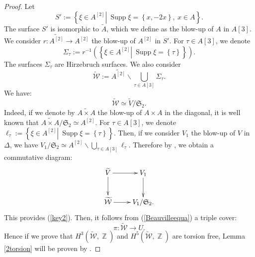 \documentclass[a4paper]{article}
\theoremstyle{remark}
\DeclareMathOperator{\Z}{\mathbb{Z}}
\DeclareMathOperator{\Supp}{Supp}
\begin{document}
\begin{proof}
Let $$S':=\left\{\left.\xi\in A^{[2]}\right|\ \Supp \xi=\left\{x,-2x\right\},\ x\in A\right\}.$$
The surface $S'$ is isomorphic to $\widetilde{A}$, which we define as the blow-up of $A$ in $A[3]$.
We consider $r:\widetilde{A^{[2]}}\rightarrow A^{[2]}$ the blow-up of $A^{[2]}$ in $S'$.
For $\tau\in A[3]$, we denote $$\Sigma_\tau:=r^{-1}\left(\left\{\left.\xi\in A^{[2]}\right|\ \Supp \xi=\left\{\tau\right\}\right\}\right).$$
The surfaces $\Sigma_\tau$ are Hirzebruch surfaces.
We also consider 
$$\widetilde{\mathcal{W}}:=\widetilde{A^{[2]}}\smallsetminus \bigcup_{\tau\in A[3]}\Sigma_\tau.$$
We have:
\begin{equation}
\widetilde{\mathcal{W}}\simeq \widetilde{V}/\mathfrak{S}_2.
\label{key2}
\end{equation}
Indeed, if we denote by $\widetilde{A\times A}$ the blow-up of $A\times A$ in the diagonal, it is well known that $\widetilde{A\times A}/\mathfrak{S}_2\simeq A^{[2]}$. 
For $\tau\in A[3]$, we denote $\ell_\tau:=\left\{\left.\xi\in A^{[2]}\right|\ \Supp \xi=\left\{\tau\right\}\right\}$.
Then, if we consider $V_1$ the blow-up of $V$ in $\Delta$, we have $V_1/\mathfrak{S}_2\simeq A^{[2]}\smallsetminus \bigcup_{\tau\in A[3]} \ell_\tau$.  
Therefore
by \cite[Corollary II 7.15]{Hartshorne}, we obtain a commutative diagram:
$$\xymatrix{\widetilde{V}\ar[r]\ar[d]&V_1\ar[d]\\
\widetilde{\mathcal{W}}\ar[r]&V_1/\mathfrak{S}_2.
}$$
This provides (\ref{key2}).
Then, it follows from (\ref{Beauvilleequa}) a triple cover:
$$\pi:\widetilde{\mathcal{W}}\rightarrow U.$$
Hence if we prove that $H^3(\widetilde{\mathcal{W}},\Z)$ and $H^5(\widetilde{\mathcal{W}},\Z)$ are torsion free, Lemma \ref{2torsion} will be proven by \cite[Theorem 5.4 ]{Transfers}.


\end{proof}
\end{document}
